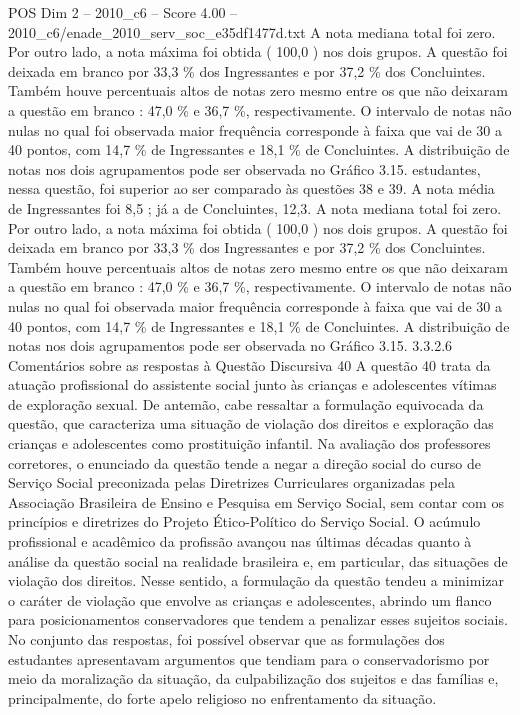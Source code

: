 \begin{textsample}{POS Dim 2 – 2010\_c6 – Score 4.00 – 2010\_c6/enade\_2010\_serv\_soc\_e35df1477d.txt}
A nota mediana total foi zero.
Por outro lado, a nota máxima foi obtida ( 100,0 ) nos dois grupos.
A questão foi deixada em branco por 33,3 \% dos Ingressantes e por 37,2 \% dos Concluintes.
Também houve percentuais altos de notas zero mesmo entre os que não deixaram a questão em branco : 47,0 \% e 36,7 \%, respectivamente.
O intervalo de notas não nulas no qual foi observada maior frequência corresponde à faixa que vai de 30 a 40 pontos, com 14,7 \% de Ingressantes e 18,1 \% de Concluintes.
A distribuição de notas nos dois agrupamentos pode ser observada no Gráfico 3.15. estudantes, nessa questão, foi superior ao ser comparado às questões 38 e 39.
A nota média de Ingressantes foi 8,5 ; já a de Concluintes, 12,3.
A nota mediana total foi zero.
Por outro lado, a nota máxima foi obtida ( 100,0 ) nos dois grupos.
A questão foi deixada em branco por 33,3 \% dos Ingressantes e por 37,2 \% dos Concluintes.
Também houve percentuais altos de notas zero mesmo entre os que não deixaram a questão em branco : 47,0 \% e 36,7 \%, respectivamente.
O intervalo de notas não nulas no qual foi observada maior frequência corresponde à faixa que vai de 30 a 40 pontos, com 14,7 \% de Ingressantes e 18,1 \% de Concluintes.
A distribuição de notas nos dois agrupamentos pode ser observada no Gráfico 3.15. 3.3.2.6 Comentários sobre as respostas à Questão Discursiva 40 A questão 40 trata da atuação profissional do assistente social junto às crianças e adolescentes vítimas de exploração sexual.
De antemão, cabe ressaltar a formulação equivocada da questão, que caracteriza uma situação de violação dos direitos e exploração das crianças e adolescentes como prostituição infantil.
Na avaliação dos professores corretores, o enunciado da questão tende a negar a direção social do curso de Serviço Social preconizada pelas Diretrizes Curriculares organizadas pela Associação Brasileira de Ensino e Pesquisa em Serviço Social, sem contar com os princípios e diretrizes do Projeto Ético-Político do Serviço Social.
O acúmulo profissional e acadêmico da profissão avançou nas últimas décadas quanto à análise da questão social na realidade brasileira e, em particular, das situações de violação dos direitos.
Nesse sentido, a formulação da questão tendeu a minimizar o caráter de violação que envolve as crianças e adolescentes, abrindo um flanco para posicionamentos conservadores que tendem a penalizar esses sujeitos sociais.
No conjunto das respostas, foi possível observar que as formulações dos estudantes apresentavam argumentos que tendiam para o conservadorismo por meio da moralização da situação, da culpabilização dos sujeitos e das famílias e, principalmente, do forte apelo religioso no enfrentamento da situação.

\end{textsample}

